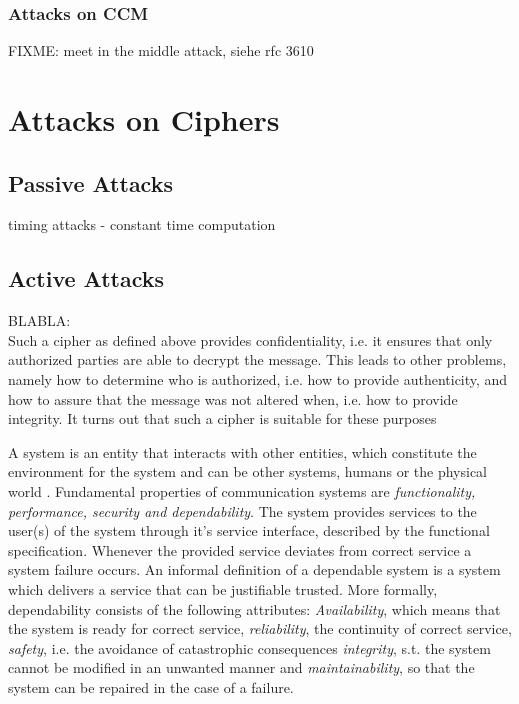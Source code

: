 \subsubsection{Attacks on CCM}

FIXME: meet in the middle attack, siehe rfc 3610



\section{Attacks on Ciphers}

\subsection{Passive Attacks}

timing attacks - constant time computation

\subsection{Active Attacks}


BLABLA:
\\

Such a cipher as defined above provides confidentiality, i.e. it ensures that only authorized parties are able to decrypt the message. This leads to other
problems, namely how to determine who is authorized, i.e. how to provide authenticity, and how to assure that the message was not altered when, i.e. how to 
provide integrity. It turns out that such a cipher is suitable for these purposes

A system is an entity that interacts with other entities, which constitute the environment for the system and
can be other systems, humans or the physical world \cite{1335465}. Fundamental properties of communication systems
are \textit{functionality, performance, security and dependability}. The system provides services to the user(s) 
of the system through it's service interface, described by the functional specification. Whenever the provided service
deviates from correct service a system failure occurs. 
An informal definition of a dependable system is a system which delivers a service that can be justifiable trusted. More formally,
dependability consists of the following attributes:
\textit{Availability}, which means that the system is ready for correct service, \textit{reliability}, the continuity of correct service,
\textit{safety}, i.e. the avoidance of catastrophic consequences \textit{integrity}, s.t. the system cannot be modified in an unwanted manner
and \textit{maintainability}, so that the system can be repaired in the case of a failure.

